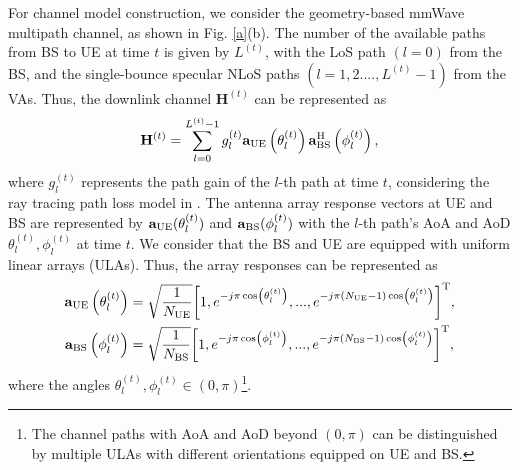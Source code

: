 \documentclass[journal,12pt,onecolumn,draftclsnofoot,]{IEEEtran}
\begin{document}
For channel model construction, we consider the geometry-based mmWave multipath channel, as shown in Fig. \ref{a}(b). 
The number of the available paths from BS to UE at time $t$ is given by $L^{(t)}$, with the LoS path $(l=0)$ from the BS, and the single-bounce specular NLoS paths $(l=1,2....,L^{(t)}-1)$ from the VAs. 
Thus, the downlink channel $\mathbf{H}^{(t)}$ can be represented as
\vspace{-2mm}
\begin{equation}
\mathbf{H}^{(t)} = \mathop \sum \limits_{l = 0}^{L^{(t)} - 1} {g_l^{(t)}}{\mathbf{a}_{{\rm UE}}}\left({{\theta _l^{(t)}}} \right)\mathbf{a}_{{\rm BS}}^{{\rm H}}\left({{\phi _l^{(t)}}} \right),
\end{equation}
{\color{black} {where ${g_l^{(t)}}$ represents the path gain of the $l$-th path at time $t$, considering the ray tracing path loss model in \cite{a18}.}} 
The antenna array response vectors at UE and BS are represented by ${\mathbf{a}_{\rm UE}}({\theta _l^{(t)}} )$ and ${\mathbf{a}_{\rm BS}}(\phi _l^{(t)} )$ with the $l$-th path's AoA and AoD ${\theta _l^{(t)}},{\phi _l^{(t)}}$ at time $t$. {\color{black} {We consider that the BS and UE are equipped with uniform linear arrays (ULAs). Thus, the array responses can be represented as
\begin{subequations}
\label{5}
\begin{align}
{\mathbf{a}_{\rm UE}}\left({\theta _l^{(t)}} \right)&=\sqrt {\frac{1}{{{N_{{\rm{UE}}}}}}} {\left[ {1,{e^{-j{ \pi}\cos \left({\theta _l^{(t)}}\right)}}, ...,{e^{-j{ \pi}({N_{{\rm{UE}}}} - 1)\cos \left({\theta _l^{(t)}}\right)}}} \right]^{\rm T}}, \\ 
{\mathbf{a}_{\rm BS}}\left({\phi _l^{(t)}} \right)&= \sqrt {\frac{1}{{{N_{{\rm{BS}}}}}}} {\left[ {1,{e^{-j{ \pi}\cos \left({\phi _l^{(t)}}\right)}}, ...,{e^{-j{ \pi}({N_{{\rm{BS}}}} - 1)\cos \left({\phi _l^{(t)}}\right)}}} \right]^{\rm T}},
\end{align}
\end{subequations}
where the angles ${\theta _l^{(t)}},{\phi _l^{(t)}}\in (0,\pi )$\footnote{\color{black}The channel paths with AoA and AoD beyond $(0,\pi)$ can be distinguished by multiple ULAs with different orientations equipped on UE and BS.}.}}

\vspace{-3.5mm}
\end{document}

